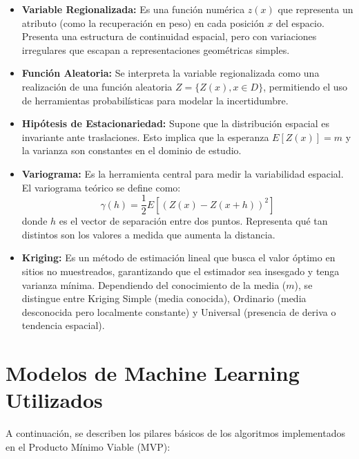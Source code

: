 \documentclass[12pt,letterpaper]{article}
\begin{document}
	\begin{itemize}
		\item \textbf{Variable Regionalizada:} Es una función numérica $z(x)$ que representa un atributo (como la recuperación en peso) en cada posición $x$ del espacio. Presenta una estructura de continuidad espacial, pero con variaciones irregulares que escapan a representaciones geométricas simples.
		
		\item \textbf{Función Aleatoria:} Se interpreta la variable regionalizada como una realización de una función aleatoria $Z = \{Z(x), x \in D\}$, permitiendo el uso de herramientas probabilísticas para modelar la incertidumbre.
		
		\item \textbf{Hipótesis de Estacionariedad:} Supone que la distribución espacial es invariante ante traslaciones. Esto implica que la esperanza $E[Z(x)] = m$ y la varianza son constantes en el dominio de estudio.
		
		\item \textbf{Variograma:} Es la herramienta central para medir la variabilidad espacial. El variograma teórico se define como:
		\begin{equation}
			\gamma(h) = \frac{1}{2} E[(Z(x) - Z(x+h))^2]
		\end{equation}
		donde $h$ es el vector de separación entre dos puntos. Representa qué tan distintos son los valores a medida que aumenta la distancia.
		
		\item \textbf{Kriging:} Es un método de estimación lineal que busca el valor óptimo en sitios no muestreados, garantizando que el estimador sea insesgado y tenga varianza mínima. Dependiendo del conocimiento de la media ($m$), se distingue entre Kriging Simple (media conocida), Ordinario (media desconocida pero localmente constante) y Universal (presencia de deriva o tendencia espacial).
	\end{itemize}
	
	\section{Modelos de Machine Learning Utilizados}
	
	A continuación, se describen los pilares básicos de los algoritmos implementados en el Producto Mínimo Viable (MVP):
	
\end{document}
